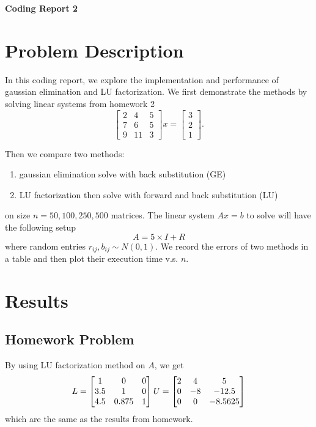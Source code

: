 \documentclass[a4paper,12pt]{article}
\begin{document}
\begin{center} %
	{\Large \bf Coding Report 2} %
	\vspace{2mm}
\end{center}  

\vspace{0.4cm}


\section{Problem Description}
In this coding report,
we explore the implementation and performance of gaussian elimination and LU factorization.
We first demonstrate the methods by solving linear systems from homework 2
$$
\begin{bmatrix}
	2 & 4 & 5 \\
	7 & 6 & 5 \\
	9 & 11 & 3
\end{bmatrix}
x = 
\begin{bmatrix}
	3 \\
	2 \\
	1
\end{bmatrix}.
$$

Then we compare two methods:
\begin{enumerate}
	\item gaussian elimination solve with back substitution (GE)
	\item LU factorization then solve with forward and back substitution (LU)
\end{enumerate}
on size $n = 50, 100, 250, 500$ matrices.
The linear system $Ax = b$ to solve will have the following setup
$$
A = 5\times I + R
$$
where random entries $r_{ij}, b_{ij} \sim N(0, 1)$.
We record the errors of two methods in a table and then plot their execution time v.s. $n$.

\section{Results}

\subsection{Homework Problem}
By using LU factorization method on $A$, we get
$$
L = \begin{bmatrix}
	1 & 0 & 0 \\
	3.5 & 1 & 0 \\
	4.5 & 0.875 & 1 
\end{bmatrix} \\
U = \begin{bmatrix}
	2 & 4 & 5 \\
	0 & -8 & -12.5 \\
	0 & 0 & -8.5625
\end{bmatrix}
$$
which are the same as the results from homework.
\end{document}
